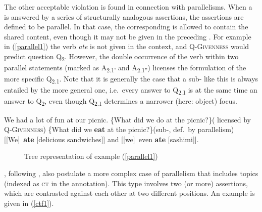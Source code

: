 \documentclass[output=paper
,modfonts
,nonflat]{langsci/langscibook}
\begin{document}
The other acceptable violation is found in connection with parallelisms. When a  is answered by a series of structurally analogous assertions, the assertions are defined to be parallel. In that case, the corresponding  is allowed to contain the shared content, even though it may not be given in the preceding . For example in (\ref{parallel1}) the verb \textit{ate} is not given in the context, and \textsc{Q-Givenness} would predict question Q\textsubscript{2}. However, the double occurrence of the verb within two parallel statements (marked as A\textsubscript{{2.1'}} and A\textsubscript{{2.1''}}) licenses the formulation of the more specific  Q\textsubscript{{2.1}}. Note that it is generally the case that a sub- like this is always entailed by the more general one, i.e.\ every answer to Q\textsubscript{{2.1}} is at the same time an answer to Q\textsubscript{2}, even though Q\textsubscript{{2.1}} determines a narrower (here: object) focus.

\begin{exe}
	\ex\label{parallel1}
	\begin{xlist}
		 We had a lot of fun at our picnic.
		 \{What did we do at the picnic?\}\hfill ( licensed by \textsc{Q-Givenness})
		 \{What did we \textbf{eat} at the picnic?\}\hfill (sub-, def.\ by parallelism)
		 {[[We]\topic\ \textbf{ate} [delicious sandwiches]\focus]\sq}
		 {and [[we]\topic\ even \textbf{ate} [sashimi]\focus]\sq}.
	\end{xlist}
\end{exe}

\begin{figure}
	\caption{Tree representation of example (\ref{parallel1})}
	\label{fig:toy2}
\end{figure}

\noindent \citet{riear17b}, following \citet{bueda03}, also postulate a more complex case of parallelism that includes  topics (indexed as \textsc{ct} in the annotation). This type involves two (or more) assertions, which are contrasted against each other at two different positions. An example is given in (\ref{ctf1}).
\end{document}
